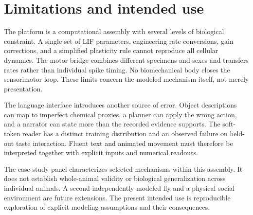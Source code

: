 \section{Limitations and intended use}
The platform is a computational assembly with several levels of biological constraint. A single set of LIF parameters, engineering rate conversions, gain corrections, and a simplified plasticity rule cannot reproduce all cellular dynamics. The motor bridge combines different specimens and sexes and transfers rates rather than individual spike timing. No biomechanical body closes the sensorimotor loop. These limits concern the modeled mechanism itself, not merely presentation.

The language interface introduces another source of error. Object descriptions can map to imperfect chemical proxies, a planner can apply the wrong action, and a narrator can state more than the recorded evidence supports. The soft-token reader has a distinct training distribution and an observed failure on held-out taste interaction. Fluent text and animated movement must therefore be interpreted together with explicit inputs and numerical readouts.

The case-study panel characterizes selected mechanisms within this assembly. It does not establish whole-animal validity or biological generalization across individual animals. A second independently modeled fly and a physical social environment are future extensions. The present intended use is reproducible exploration of explicit modeling assumptions and their consequences.
